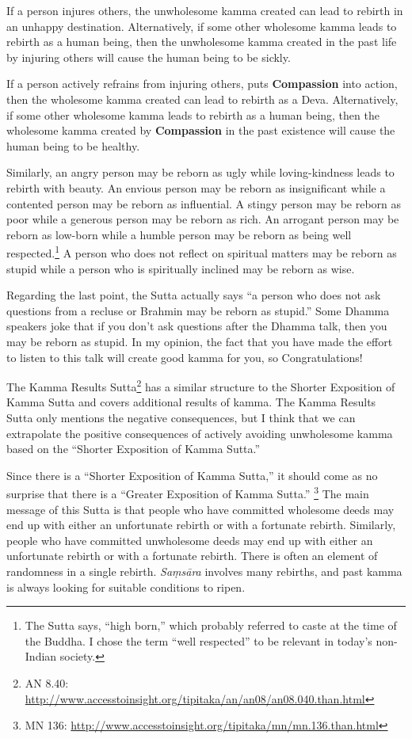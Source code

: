 If a person injures others, the unwholesome kamma created can lead to rebirth in an unhappy destination. Alternatively, if some other wholesome kamma leads to rebirth as a human being, then the unwholesome kamma created in the past life by injuring others will cause the human being to be sickly. 

If a person actively refrains from injuring others, puts \textbf{Compassion} into action, then the wholesome kamma created can lead to rebirth as a Deva. Alternatively, if some other wholesome kamma leads to rebirth as a human being, then the wholesome kamma created by \textbf{Compassion} in the past existence will cause the human being to be healthy.

Similarly, an angry person may be reborn as ugly while loving-kindness leads to rebirth with beauty. An envious person may be reborn as insignificant while a contented person may be reborn as influential. A stingy person may be reborn as poor while a generous person may be reborn as rich. An arrogant person may be reborn as low-born while a humble person may be reborn as being well respected.\footnote{The Sutta says, “high born,” which probably referred to caste at the time of the Buddha. I chose the term “well respected” to be relevant in today’s non-Indian society.} A person who does not reflect on spiritual matters may be reborn as stupid while a person who is spiritually inclined may be reborn as wise.

Regarding the last point, the Sutta actually says “a person who does not ask questions from a recluse or Brahmin may be reborn as stupid.” Some Dhamma speakers joke that if you don’t ask questions after the Dhamma talk, then you may be reborn as stupid. In my opinion, the fact that you have made the effort to listen to this talk will create good kamma for you, so Congratulations! \smiley 

The Kamma Results Sutta\footnote{AN 8.40: \url{http://www.accesstoinsight.org/tipitaka/an/an08/an08.040.than.html}} has a similar structure to the Shorter Exposition of Kamma Sutta and covers additional results of kamma. The Kamma Results Sutta only mentions the negative consequences, but I think that we can extrapolate the positive consequences of actively avoiding unwholesome kamma based on the “Shorter Exposition of Kamma Sutta.”

Since there is a “Shorter Exposition of Kamma Sutta,” it should come as no surprise that there is a “Greater Exposition of Kamma Sutta.” \footnote{MN 136: \url{http://www.accesstoinsight.org/tipitaka/mn/mn.136.than.html}} The main message of this Sutta is that people who have committed wholesome deeds may end up with either an unfortunate rebirth or with a fortunate rebirth. Similarly, people who have committed unwholesome deeds may end up with either an unfortunate rebirth or with a fortunate rebirth. There is often an element of randomness in a single rebirth. \textit{Saṃsāra} involves many rebirths, and past kamma is always looking for suitable conditions to ripen.

